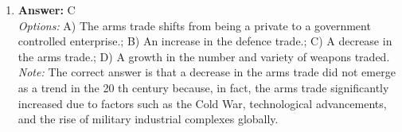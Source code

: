 \documentclass[12pt]{article}
\begin{document}
\begin{enumerate}[label=\arabic*.]
\\ \textit{Note:} The cyber-security discourse began to emerge in the 1970 s as it was during this decade that the proliferation of computer technology and the recognition of vulnerabilities in digital systems prompted serious discussions among politicians, academics, and industry experts about the need for security measures and policies to protect sensitive information and infrastructure.
\item \textbf{Answer:} C
\\ \textit{Options:} A) The arms trade shifts from being a private to a government controlled enterprise.; B) An increase in the defence trade.; C) A decrease in the arms trade.; D) A growth in the number and variety of weapons traded.
\\ \textit{Note:} The correct answer is that a decrease in the arms trade did not emerge as a trend in the 20 th century because, in fact, the arms trade significantly increased due to factors such as the Cold War, technological advancements, and the rise of military industrial complexes globally.
\end{enumerate}
\end{document}
